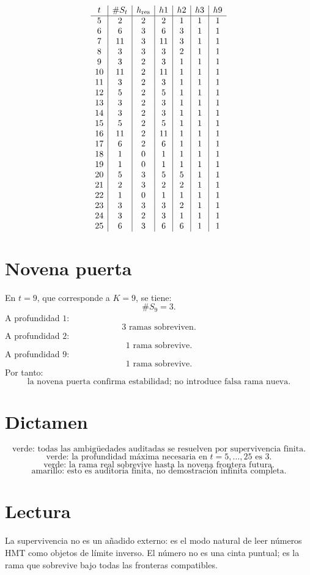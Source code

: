 \documentclass[11pt,a4paper]{article}
\begin{document}
\[
\begin{array}{c|c|c|c|c|c|c}
t&\#S_t&h_{\rm res}&h1&h2&h3&h9\\
\hline
5 & 2 & 2 & 2 & 1 & 1 & 1 \\
6 & 6 & 3 & 6 & 3 & 1 & 1 \\
7 & 11 & 3 & 11 & 3 & 1 & 1 \\
8 & 3 & 3 & 3 & 2 & 1 & 1 \\
9 & 3 & 2 & 3 & 1 & 1 & 1 \\
10 & 11 & 2 & 11 & 1 & 1 & 1 \\
11 & 3 & 2 & 3 & 1 & 1 & 1 \\
12 & 5 & 2 & 5 & 1 & 1 & 1 \\
13 & 3 & 2 & 3 & 1 & 1 & 1 \\
14 & 3 & 2 & 3 & 1 & 1 & 1 \\
15 & 5 & 2 & 5 & 1 & 1 & 1 \\
16 & 11 & 2 & 11 & 1 & 1 & 1 \\
17 & 6 & 2 & 6 & 1 & 1 & 1 \\
18 & 1 & 0 & 1 & 1 & 1 & 1 \\
19 & 1 & 0 & 1 & 1 & 1 & 1 \\
20 & 5 & 3 & 5 & 5 & 1 & 1 \\
21 & 2 & 3 & 2 & 2 & 1 & 1 \\
22 & 1 & 0 & 1 & 1 & 1 & 1 \\
23 & 3 & 3 & 3 & 2 & 1 & 1 \\
24 & 3 & 2 & 3 & 1 & 1 & 1 \\
25 & 6 & 3 & 6 & 6 & 1 & 1 \\
\end{array}
\]

\section{Novena puerta}

En \(t=9\), que corresponde a \(K=9\), se tiene:
\[
\#S_9=3.
\]
A profundidad \(1\):
\[
3\text{ ramas sobreviven}.
\]
A profundidad \(2\):
\[
1\text{ rama sobrevive}.
\]
A profundidad \(9\):
\[
1\text{ rama sobrevive}.
\]
Por tanto:
\[
\boxed{
\text{la novena puerta confirma estabilidad; no introduce falsa rama nueva.}
}
\]

\section{Dictamen}

\[
\boxed{
\text{verde: todas las ambigüedades auditadas se resuelven por supervivencia finita.}
}
\]
\[
\boxed{
\text{verde: la profundidad máxima necesaria en }t=5,\ldots,25\text{ es }3.
}
\]
\[
\boxed{
\text{verde: la rama real sobrevive hasta la novena frontera futura.}
}
\]
\[
\boxed{
\text{amarillo: esto es auditoría finita, no demostración infinita completa.}
}
\]

\section{Lectura}

La supervivencia no es un añadido externo: es el modo natural de leer números HMT como objetos de límite inverso. El número no es una cinta puntual; es la rama que sobrevive bajo todas las fronteras compatibles.
\end{document}
